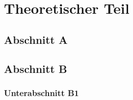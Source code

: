 \chapter{Theoretischer Teil}
\label{cap:theorie}

\section{Abschnitt A}
\label{cap:theorie:defA}

\section{Abschnitt B}
\label{cap:theorie:def}

\subsection{Unterabschnitt B1}
\label{cap:theorie:defC}